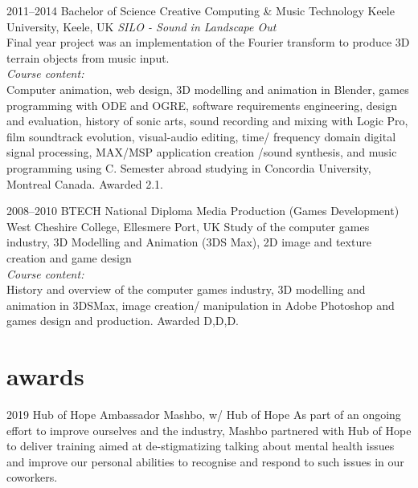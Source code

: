 \documentclass[]{friggeri-cv} %
\begin{document}
\begin{entrylist}


\entry
{2011--2014} 
{Bachelor of Science {\normalfont Creative Computing \& Music Technology}} 
{Keele University, Keele, UK} 
{\emph{SILO - Sound in Landscape Out} \\ Final year project was an implementation of the Fourier transform to produce 3D terrain objects from music input.} \\
{\emph{Course content:} \\ Computer animation, web design, 3D modelling and animation in Blender, games programming with ODE and OGRE, software requirements engineering, design and evaluation, history of sonic arts, sound recording and mixing with Logic Pro, film soundtrack evolution, visual-audio editing, time/ frequency domain digital signal processing, MAX/MSP application creation /sound synthesis, and music programming using C. Semester abroad studying in Concordia University, Montreal Canada. Awarded 2.1.}


\entry
{2008--2010}
{BTECH National Diploma {\normalfont Media Production (Games Development)}}
{West Cheshire College, Ellesmere Port, UK}
{Study of the computer games industry, 3D Modelling and Animation (3DS
Max), 2D image and texture creation and game design} \\
{\emph{Course content:} \\
History and overview of the computer games industry, 3D modelling and animation
in 3DSMax, image creation/ manipulation in Adobe Photoshop and
games design and production. Awarded D,D,D.}


\end{entrylist}




\section{awards}

\begin{entrylist}


\entry
{2019}
{Hub of Hope Ambassador}
{Mashbo, w/ Hub of Hope}
{As part of an ongoing effort to improve ourselves and the industry, Mashbo 
partnered with Hub of Hope to deliver training aimed at de-stigmatizing talking
about mental health issues and improve our personal abilities to recognise and 
respond to such issues in our coworkers.}



\end{entrylist}
\end{document}
